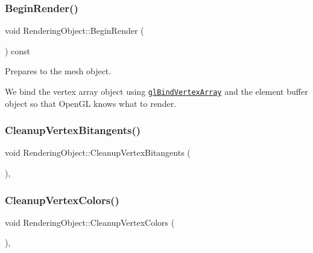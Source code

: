 \subsubsection{\texorpdfstring{Begin\+Render()}{BeginRender()}}
{\footnotesize\ttfamily void Rendering\+Object\+::\+Begin\+Render (\begin{DoxyParamCaption}{ }\end{DoxyParamCaption}) const\hspace{0.3cm}{\ttfamily [virtual]}}



Prepares to the mesh object.

We bind the vertex array object using \href{https://www.opengl.org/sdk/docs/man/html/glBindVertexArray.xhtml}{\tt gl\+Bind\+Vertex\+Array} and the element buffer object so that Open\+GL knows what to render. \hypertarget{class_rendering_object_ae60c4f13ea817ffcb722d34250664c41}{}\label{class_rendering_object_ae60c4f13ea817ffcb722d34250664c41}
\subsubsection{\texorpdfstring{Cleanup\+Vertex\+Bitangents()}{CleanupVertexBitangents()}}
{\footnotesize\ttfamily void Rendering\+Object\+::\+Cleanup\+Vertex\+Bitangents (\begin{DoxyParamCaption}{ }\end{DoxyParamCaption})\hspace{0.3cm}{\ttfamily [protected]}, {\ttfamily [virtual]}}

\hypertarget{class_rendering_object_adce4a6d6406eb589b088bedd19127f32}{}\label{class_rendering_object_adce4a6d6406eb589b088bedd19127f32}
\subsubsection{\texorpdfstring{Cleanup\+Vertex\+Colors()}{CleanupVertexColors()}}
{\footnotesize\ttfamily void Rendering\+Object\+::\+Cleanup\+Vertex\+Colors (\begin{DoxyParamCaption}{ }\end{DoxyParamCaption})\hspace{0.3cm}{\ttfamily [protected]}, {\ttfamily [virtual]}}

